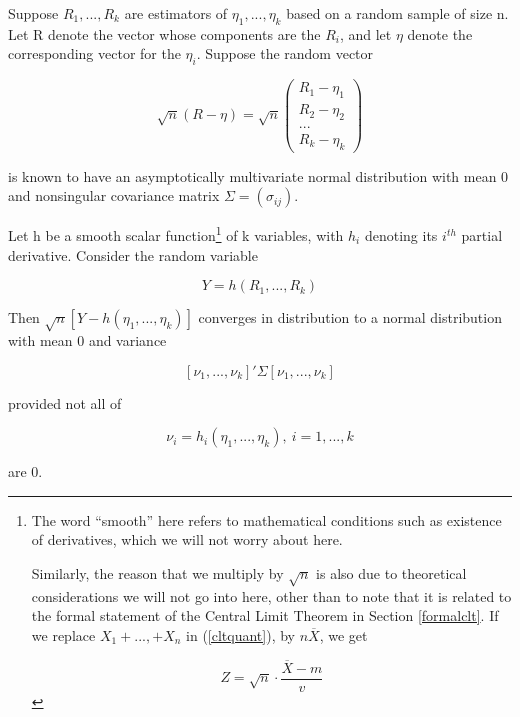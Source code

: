 \begin{theorem}

Suppose $R_1,...,R_k$ are estimators of $\eta_1,...,\eta_k$ based on a
random sample of size n.  Let R denote the vector whose components are
the $R_i$, and let $\eta$ denote the corresponding vector for the
$\eta_i$.  
Suppose the random vector 

\begin{equation}
\sqrt{n} (R - \eta) =
\sqrt{n} 
\left (
\begin{array}{l}
   R_1 - \eta_1 \\
   R_2 - \eta_2 \\
   ... \\
   R_k- \eta_k  
\end{array}
\right )
\end{equation}

is known to have an asymptotically multivariate normal distribution with
mean 0 and nonsingular covariance matrix $\Sigma = (\sigma_{ij})$.  

Let h be a smooth scalar function\footnote{The word ``smooth'' here
refers to mathematical conditions such as existence of derivatives,
which we will not worry about here.  

Similarly, the reason that we multiply by $\sqrt{n}$ is also due to
theoretical considerations we will not go into here, other than to note
that it is related to the formal statement of the Central Limit Theorem
in Section \ref{formalclt}.  If we replace $X_1+...,+X_n$ in
(\ref{cltquant}), by $n \overline{X}$, we get

\begin{equation}
Z = \sqrt{n} \cdot \frac{\overline{X}-m}{v}
\end{equation}

} of k variables, with $h_i$ denoting its $i^{th}$ partial derivative.
Consider the random variable 

\begin{equation}
Y = h(R_1,...,R_k)
\end{equation}

Then $\sqrt{n}[Y-h(\eta_1,...,\eta_k)]$ converges in distribution to a
normal distribution with mean 0 and variance

\begin{equation}
\label{avar}
[\nu_1,...,\nu_k]' \Sigma [\nu_1,...,\nu_k]
\end{equation}

provided not all of 

\begin{equation}
\nu_i = h_i(\eta_1,...,\eta_k), ~ i=1,...,k
\end{equation}

are 0.

\end{theorem}

